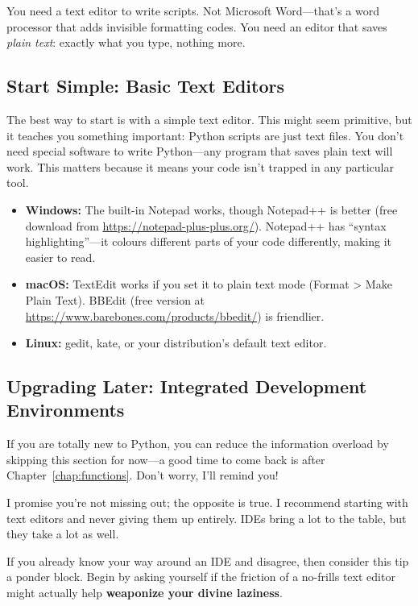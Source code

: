 You need a text editor to write scripts. Not Microsoft Word---that's a word processor that adds invisible formatting codes. You need an editor that saves \emph{plain text}: exactly what you type, nothing more.

\subsection{Start Simple: Basic Text Editors}

The best way to start is with a simple text editor. This might seem primitive, but it teaches you something important: Python scripts are just text files. You don't need special software to write Python---any program that saves plain text will work. This matters because it means your code isn't trapped in any particular tool.

\begin{itemize}
    \item \textbf{Windows:} The built-in Notepad works, though Notepad++ is better (free download from \url{https://notepad-plus-plus.org/}). Notepad++ has ``syntax highlighting''---it colours different parts of your code differently, making it easier to read.
    \item \textbf{macOS:} TextEdit works if you set it to plain text mode (Format > Make Plain Text). BBEdit (free version at \url{https://www.barebones.com/products/bbedit/}) is friendlier.
    \item \textbf{Linux:} gedit, kate, or your distribution's default text editor.
\end{itemize}

\subsection{Upgrading Later: Integrated Development Environments}
\label{subsec:ide}

\begin{tip}
If you are totally new to Python, you can reduce the information overload by skipping this section for now---a good time to come back is after Chapter~\ref{chap:functions}. Don't worry, I'll remind you!

I promise you're not missing out; the opposite is true. I recommend starting with text editors and never giving them up entirely. IDEs bring a lot to the table, but they take a lot as well.

If you already know your way around an IDE and disagree, then consider this tip a ponder block. Begin by asking yourself if the friction of a no-frills text editor might actually help \textbf{weaponize your divine laziness}.
\end{tip}

